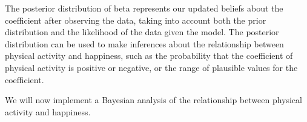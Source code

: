 \documentclass[
  a4paper,
]{article}
\newenvironment{Shaded}{\begin{snugshade}}{\end{snugshade}}
\newcommand{\AttributeTok}[1]{\textcolor[rgb]{0.77,0.63,0.00}{#1}}
\newcommand{\CommentTok}[1]{\textcolor[rgb]{0.56,0.35,0.01}{\textit{#1}}}
\newcommand{\ConstantTok}[1]{\textcolor[rgb]{0.00,0.00,0.00}{#1}}
\newcommand{\ControlFlowTok}[1]{\textcolor[rgb]{0.13,0.29,0.53}{\textbf{#1}}}
\newcommand{\DecValTok}[1]{\textcolor[rgb]{0.00,0.00,0.81}{#1}}
\newcommand{\FunctionTok}[1]{\textcolor[rgb]{0.00,0.00,0.00}{#1}}
\newcommand{\NormalTok}[1]{#1}
\newcommand{\OtherTok}[1]{\textcolor[rgb]{0.56,0.35,0.01}{#1}}
\newcommand{\SpecialCharTok}[1]{\textcolor[rgb]{0.00,0.00,0.00}{#1}}
\newcommand{\StringTok}[1]{\textcolor[rgb]{0.31,0.60,0.02}{#1}}
\begin{document}
The posterior distribution of beta represents our updated beliefs about
the coefficient after observing the data, taking into account both the
prior distribution and the likelihood of the data given the model. The
posterior distribution can be used to make inferences about the
relationship between physical activity and happiness, such as the
probability that the coefficient of physical activity is positive or
negative, or the range of plausible values for the coefficient.

We will now implement a Bayesian analysis of the relationship between
physical activity and happiness.

\begin{Shaded}
\end{Shaded}
\end{document}
